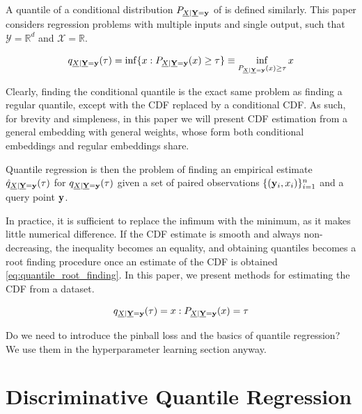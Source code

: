 \documentclass[twoside]{article} \usepackage{aistats2017}
\theoremstyle{definition}
\theoremstyle{remark}
\newcommand{\rv}[1]{\underline{#1}}
\newcommand{\warn}[1]{{\color{RedOrange} #1}}
\begin{document}
		A quantile of a conditional distribution $P_{\rv{X} | \bvec{\rv{Y}} = \bvec{y}}$ of is defined similarly. This paper considers regression problems with multiple inputs and single output, such that $\mathcal{Y} = \mathbb{R}^{d}$ and $\mathcal{X} = \mathbb{R}$.
		
		\begin{equation}
			q_{\rv{X} | \bvec{\rv{Y}} = \bvec{y}}(\tau) = \inf\{x : P_{\rv{X} | \bvec{\rv{Y}} = \bvec{y}}(x) \geq \tau\} \equiv \inf_{P_{\rv{X} | \bvec{\rv{Y}} = \bvec{y}}(x) \geq \tau} x
		\label{eq:conditional_quantile}
		\end{equation}
		
		Clearly, finding the conditional quantile is the exact same problem as finding a regular quantile, except with the CDF replaced by a conditional CDF. As such, for brevity and simpleness, in this paper we will present CDF estimation from a general embedding with general weights, whose form both conditional embeddings and regular embeddings share.
		
		Quantile regression is then the problem of finding an empirical estimate $\hat{q}_{\rv{X} | \bvec{\rv{Y}} = \bvec{y}}(\tau)$ for $q_{\rv{X} | \bvec{\rv{Y}} = \bvec{y}}(\tau)$ given a set of paired observations $\{(\mathbf{y}_{i}, x_{i})\}_{i = 1}^{n}$ and a query point $\mathbf{y}$.
		
		In practice, it is sufficient to replace the infimum with the minimum, as it makes little numerical difference. If the CDF estimate is smooth and always non-decreasing, the inequality becomes an equality, and obtaining quantiles becomes a root finding procedure once an estimate of the CDF is obtained \eqref{eq:quantile_root_finding}. In this paper, we present methods for estimating the CDF from a dataset.
		
		\begin{equation}
			q_{\rv{X} | \bvec{\rv{Y}} = \bvec{y}}(\tau) = x : P_{\rv{X} | \bvec{\rv{Y}} = \bvec{y}}(x) = \tau
		\label{eq:quantile_root_finding}
		\end{equation}	
	
		\warn{Do we need to introduce the pinball loss and the basics of quantile regression? We use them in the hyperparameter learning section anyway.}

\section{Discriminative Quantile Regression}
\label{sec:discriminative_quantile_regression}
\end{document}
